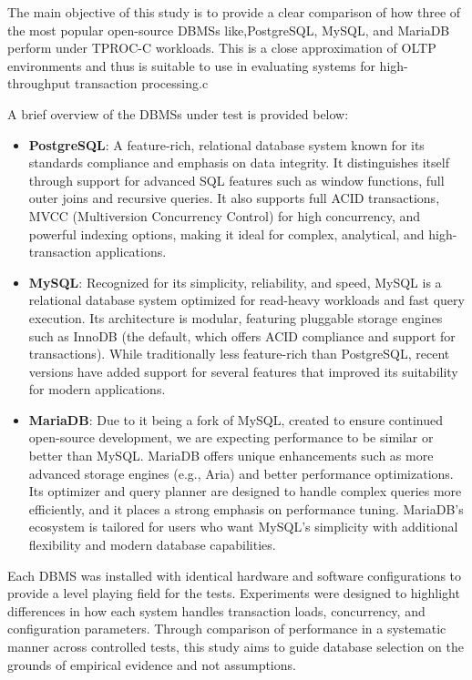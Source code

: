 \newpage

The main objective of this study is to provide a clear comparison of how three of the most popular open-source DBMSs like,PostgreSQL, MySQL, and MariaDB perform under TPROC-C workloads. This is a close approximation of OLTP environments and thus is suitable to use in evaluating systems for high-throughput transaction processing.c

A brief overview of the DBMSs under test is provided below:

\begin{itemize}
    \setlength\itemsep{0.1em}
    \item \textbf{PostgreSQL}\cite{postgresql-docs}: A feature-rich, relational database system known for its standards compliance and emphasis on data integrity. It distinguishes itself through support for advanced SQL features such as window functions, full outer joins and recursive queries. It also supports full ACID transactions, MVCC (Multiversion Concurrency Control) for high concurrency, and powerful indexing options, making it ideal for complex, analytical, and high-transaction applications.

    \item \textbf{MySQL}\cite{mysql-docs}: Recognized for its simplicity, reliability, and speed, MySQL is a relational database system optimized for read-heavy workloads and fast query execution. Its architecture is modular, featuring pluggable storage engines such as InnoDB (the default, which offers ACID compliance and support for transactions). While traditionally less feature-rich than PostgreSQL, recent versions have added support for several features that improved its suitability for modern applications.

    \item \textbf{MariaDB}\cite{mariadb-docs}: Due to it being a fork of MySQL, created to ensure continued open-source development, we are expecting performance to be similar or better than MySQL. MariaDB offers unique enhancements such as more advanced storage engines (e.g., Aria) and better performance optimizations. Its optimizer and query planner are designed to handle complex queries more efficiently, and it places a strong emphasis on performance tuning. MariaDB’s ecosystem is tailored for users who want MySQL's simplicity with additional flexibility and modern database capabilities.

\end{itemize}

Each DBMS was installed with identical hardware and software configurations to provide a level playing field for the tests. Experiments were designed to highlight differences in how each system handles transaction loads, concurrency, and configuration parameters. Through comparison of performance in a systematic manner across controlled tests, this study aims to guide database selection on the grounds of empirical evidence and not assumptions.


